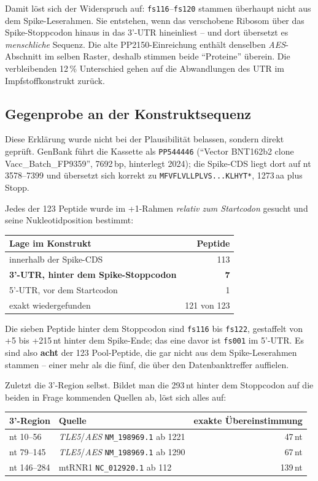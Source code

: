 \documentclass[11pt,a4paper]{article}
\begin{document}
Damit löst sich der Widerspruch auf: \texttt{fs116}--\texttt{fs120} stammen
überhaupt nicht aus dem Spike-Leserahmen. Sie entstehen, wenn das verschobene
Ribosom über das Spike-Stoppcodon hinaus in das 3'-UTR hineinliest -- und dort
übersetzt es \emph{menschliche} Sequenz. Die alte PP2150-Einreichung enthält
denselben \emph{AES}-Abschnitt im selben Raster, deshalb stimmen beide
``Proteine'' überein. Die verbleibenden 12\,\% Unterschied gehen auf die
Abwandlungen des UTR im Impfstoffkonstrukt zurück.

\subsection{Gegenprobe an der Konstruktsequenz}

Diese Erklärung wurde nicht bei der Plausibilität belassen, sondern direkt
geprüft. GenBank führt die Kassette als \texttt{PP544446} (``Vector BNT162b2
clone Vacc\_Batch\_FP9359'', 7692\,bp, hinterlegt 2024); die Spike-CDS liegt
dort auf nt 3578--7399 und übersetzt sich korrekt zu
\texttt{MFVFLVLLPLVS...KLHYT*}, 1273\,aa plus Stopp.

Jedes der 123 Peptide wurde im +1-Rahmen \emph{relativ zum Startcodon} gesucht
und seine Nukleotidposition bestimmt:

\begin{center}
\begin{tabular}{lr}
\toprule
Lage im Konstrukt & Peptide \\
\midrule
innerhalb der Spike-CDS & 113 \\
\textbf{3'-UTR, hinter dem Spike-Stoppcodon} & \textbf{7} \\
5'-UTR, vor dem Startcodon & 1 \\
\midrule
exakt wiedergefunden & 121 von 123 \\
\bottomrule
\end{tabular}
\end{center}

Die sieben Peptide hinter dem Stoppcodon sind \texttt{fs116} bis
\texttt{fs122}, gestaffelt von +5 bis +215\,nt hinter dem Spike-Ende; das eine
davor ist \texttt{fs001} im 5'-UTR. Es sind also \textbf{acht} der 123
Pool-Peptide, die gar nicht aus dem Spike-Leserahmen stammen -- einer mehr als
die fünf, die über den Datenbanktreffer auffielen.

Zuletzt die 3'-Region selbst. Bildet man die 293\,nt hinter dem Stoppcodon auf
die beiden in Frage kommenden Quellen ab, löst sich alles auf:

\begin{center}
\begin{tabular}{llr}
\toprule
3'-Region & Quelle & exakte Übereinstimmung \\
\midrule
nt 10--56 & \emph{TLE5}/\emph{AES} \texttt{NM\_198969.1} ab 1221 & 47\,nt \\
nt 79--145 & \emph{TLE5}/\emph{AES} \texttt{NM\_198969.1} ab 1290 & 67\,nt \\
nt 146--284 & mtRNR1 \texttt{NC\_012920.1} ab 112 & 139\,nt \\
\bottomrule
\end{tabular}
\end{center}
\end{document}
